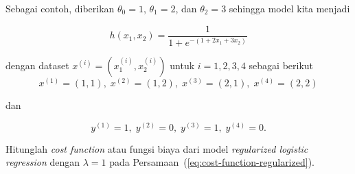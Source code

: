 \documentclass[twoside,12pt]{article}
\newenvironment{myblock}[1]{%
    \tcolorbox[beamer,%
    noparskip,breakable,
    colback=LightBlue,colframe=DarkBlue,%
    colbacklower=DarkBlue!75!LightBlue,%
    title=#1]}%
    {\endtcolorbox}
\begin{document}
\begin{myblock}{Latihan}
Sebagai contoh, diberikan $\theta_0 = 1$, $\theta_1 = 2$, dan $\theta_2 = 3$ sehingga model kita menjadi

\begin{equation}
	h(x_1, x_2) = \frac{1}{1 + e^{-(1 + 2x_1 + 3 x_2)}}  
	\label{eq:model-lr-example}
\end{equation}

dengan dataset $x^{(i)} = (x_1^{(i)}, x_2^{(i)})$ untuk $i = 1,2,3,4$ sebagai berikut 
\begin{equation}
	x^{(1)} = (1,1), \; x^{(2)} = (1,2), \; x^{(3)} = (2,1), \; x^{(4)} = (2,2) 
	\label{eq:dataset-x}
\end{equation} 

dan

\begin{equation}
	y^{(1)} = 1, \; y^{(2)} = 0, \; y^{(3)} = 1, \; y^{(4)} = 0.
	\label{eq:dataset-y}
\end{equation} 

Hitunglah \textit{cost function} atau fungsi biaya dari model \textit{regularized logistic regression} dengan $\lambda = 1$ pada Persamaan~(\ref{eq:cost-function-regularized}). 
\end{myblock}
\end{document}
